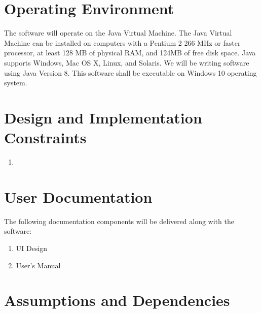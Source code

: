 \documentclass{scrreprt}
\begin{document}
\section{Operating Environment}
The software will operate on the Java Virtual Machine. The Java Virtual Machine
can be installed on computers with a Pentium 2 266 MHz or faster processor, at
least 128 MB of physical RAM, and 124MB of free disk space. Java supports Windows,
Mac OS X, Linux, and Solaris. We will be writing software using Java Version 8.
This software shall be executable on Windows 10 operating system.

\section{Design and Implementation Constraints}
\begin{enumerate}
    \item
\end{enumerate}

\section{User Documentation}

The following documentation components will be delivered along with the software:
\begin{enumerate}
    \item UI Design
    \item User's Manual
\end{enumerate}

\section{Assumptions and Dependencies}

\end{document}
